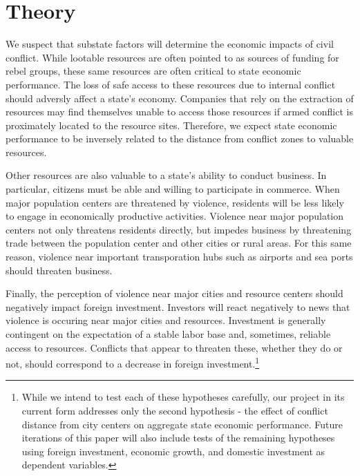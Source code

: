 \section{Theory}
\label{theory}


We suspect that substate factors will determine the economic impacts of civil conflict.  While lootable resources are often pointed to as sources of funding for rebel groups, these same resources are often critical to state economic performance.  The loss of safe access to these resources due to internal conflict should adversly affect a state's economy.  Companies that rely on the extraction of resources may find themselves unable to access those resources if armed conflict is proximately located to the resource sites.  Therefore, we expect state economic performance to be inversely related to the distance from conflict zones to valuable resources.

Other resources are also valuable to a state's ability to conduct business.  In particular, citizens must be able and willing to participate in commerce.  When major population centers are threatened by violence, residents will be less likely to engage in economically productive activities.  Violence near major population centers not only threatens residents directly, but impedes business by threatening trade between the population center and other cities or rural areas.  For this same reason, violence near important transporation hubs such as airports and sea ports should threaten business.

Finally, the perception of violence near major cities and resource centers should negatively impact foreign investment.  Investors will react negatively to news that violence is occuring near major cities and resources.  Investment is generally contingent on the expectation of a stable labor base and, sometimes, reliable access to resources.  Conflicts that appear to threaten these, whether they do or not, should correspond to a decrease in foreign investment.\footnote{While we intend to test each of these hypotheses carefully, our project in its current form addresses only the second hypothesis - the effect of conflict distance from city centers on aggregate state economic performance.  Future iterations of this paper will also include tests of the remaining hypotheses using foreign investment, economic growth, and domestic investment as dependent variables.}

